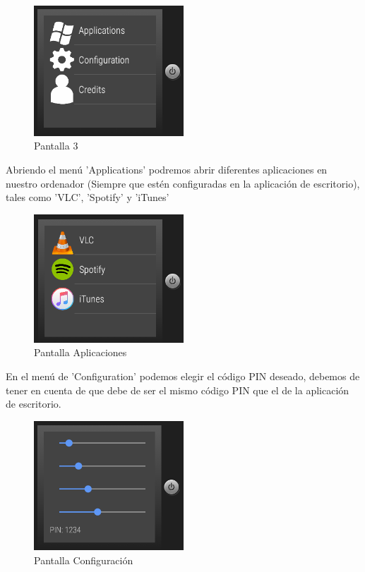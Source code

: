 \documentclass{documentation}
\begin{document}
\begin{figure}[!ht]
	\centering
	\includegraphics[width=0.5\textwidth]{figures/sw/3.png}
	\caption{Pantalla 3}
\end{figure}

Abriendo el menú 'Applications' podremos abrir diferentes aplicaciones en nuestro ordenador (Siempre que estén configuradas en la aplicación de escritorio), tales como 'VLC', 'Spotify' y 'iTunes'

\begin{figure}[!ht]
	\centering
	\includegraphics[width=0.5\textwidth]{figures/sw/4.png}
	\caption{Pantalla Aplicaciones}
\end{figure}
\newpage
En el menú de 'Configuration' podemos elegir el código PIN deseado, debemos de tener en cuenta de que debe de ser el mismo código PIN que el de la aplicación de escritorio.

\begin{figure}[!ht]
	\centering
	\includegraphics[width=0.5\textwidth]{figures/sw/5.png}
	\caption{Pantalla Configuración}
\end{figure}
\end{document}
